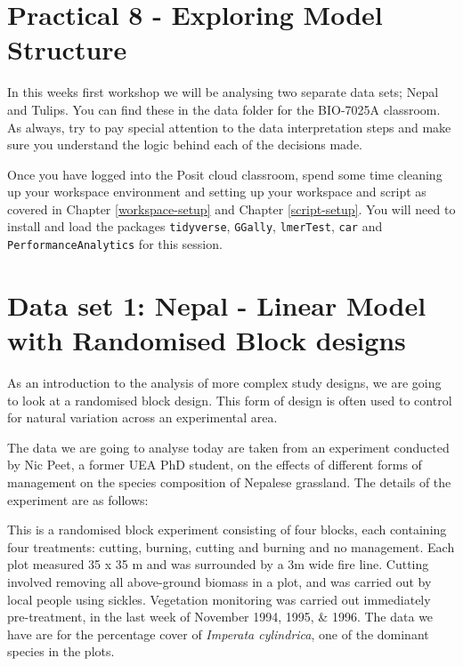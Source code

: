 \documentclass[
]{book}
\begin{document}
\hypertarget{practical-8---exploring-model-structure}{%
\section{Practical 8 - Exploring Model Structure}\label{practical-8---exploring-model-structure}}

In this weeks first workshop we will be analysing two separate data sets; Nepal and Tulips. You can find these in the data folder for the BIO-7025A classroom. As always, try to pay special attention to the data interpretation steps and make sure you understand the logic behind each of the decisions made.

Once you have logged into the Posit cloud classroom, spend some time cleaning up your workspace environment and setting up your workspace and script as covered in Chapter \ref{workspace-setup} and Chapter \ref{script-setup}. You will need to install and load the packages \texttt{tidyverse}, \texttt{GGally}, \texttt{lmerTest}, \texttt{car} and \texttt{PerformanceAnalytics} for this session.

\hypertarget{data-set-1-nepal---linear-model-with-randomised-block-designs}{%
\section{Data set 1: Nepal - Linear Model with Randomised Block designs}\label{data-set-1-nepal---linear-model-with-randomised-block-designs}}

As an introduction to the analysis of more complex study designs, we are going to look at a randomised block design. This form of design is often used to control for natural variation across an experimental area.

The data we are going to analyse today are taken from an experiment conducted by Nic Peet, a former UEA PhD student, on the effects of different forms of management on the species composition of Nepalese grassland. The details of the experiment are as follows:

This is a randomised block experiment consisting of four blocks, each containing four treatments: cutting, burning, cutting and burning and no management. Each plot measured 35 x 35 m and was surrounded by a 3m wide fire line. Cutting involved removing all above-ground biomass in a plot, and was carried out by local people using sickles. Vegetation monitoring was carried out immediately pre-treatment, in the last week of November 1994, 1995, \& 1996. The data we have are for the percentage cover of \emph{Imperata cylindrica}, one of the dominant species in the plots.
\end{document}
